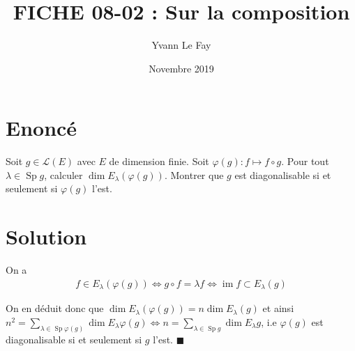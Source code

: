 \documentclass{article}
\newcommand*{\QED}{\hfill\ensuremath{\blacksquare}}%
\DeclareMathOperator{\im}{im}
\DeclareMathOperator{\Sp}{Sp}
\begin{document}
\title{FICHE 08-02 : Sur la composition}
\author{Yvann Le Fay}
\date{Novembre 2019}
\maketitle
\section*{Enoncé}
Soit $g \in \mathcal{L}(E)$ avec $E$ de dimension finie. Soit $\varphi(g) : f \mapsto f\circ g$. Pour tout $\lambda\in \Sp g$, calculer $\dim E_{\lambda}(\varphi(g))$. Montrer que $g$ est diagonalisable si et seulement si $\varphi(g)$ l'est.
\section*{Solution}
On a 
\begin{align*}
	f \in E_{\lambda}(\varphi(g)) \Longleftrightarrow g \circ f = \lambda f \Longleftrightarrow \im f \subset E_{\lambda}(g)
\end{align*}

On en déduit donc que $\dim E_{\lambda}(\varphi(g)) = n\dim E_{\lambda}(g)$ et ainsi $n^2 = \sum_{\lambda\in \Sp\varphi(g)} \dim E_{\lambda}\varphi(g) \Longleftrightarrow n = \sum_{\lambda \in \Sp g} \dim E_{\lambda}g$, i.e $\varphi(g)$ est diagonalisable si et seulement si $g$ l'est. 
\QED
\end{document}
